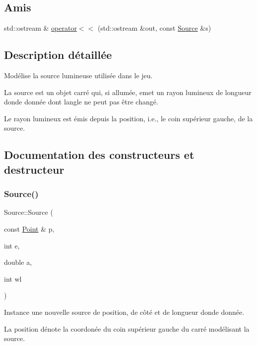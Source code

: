 \subsection*{Amis}
\begin{DoxyCompactItemize}
\item 
std\+::ostream \& \mbox{\hyperlink{class_source_a8d511bf7c5356d4566edef44d3879786}{operator$<$$<$}} (std\+::ostream \&out, const \mbox{\hyperlink{class_source}{Source}} \&s)
\end{DoxyCompactItemize}


\subsection{Description détaillée}
Modélise la source lumineuse utilisée dans le jeu. 

La source est un objet carré qui, si allumée, emet un rayon lumineux de longueur d\textquotesingle{}onde donnée dont l\textquotesingle{}angle ne peut pas être changé. 

Le rayon lumineux est émis depuis la position, i.\+e., le coin supérieur gauche, de la source. 

\subsection{Documentation des constructeurs et destructeur}
\mbox{\label{class_source_abac037335dd35772aa077ab3d27ee5b2}} 
\subsubsection{\texorpdfstring{Source()}{Source()}}
{\footnotesize\ttfamily Source\+::\+Source (\begin{DoxyParamCaption}\item[{const \mbox{\hyperlink{class_point}{Point}} \&}]{p,  }\item[{int}]{e,  }\item[{double}]{a,  }\item[{int}]{wl }\end{DoxyParamCaption})}

Instance une nouvelle source de position, de côté et de longueur d\textquotesingle{}onde donnée. 

La position dénote la coordonée du coin supérieur gauche du carré modélisant la source. 


